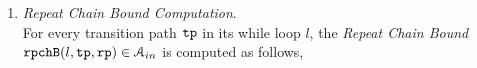 \begin{enumerate}
\begin{enumerate}
%
%
\item  \emph{Repeat Chain Bound Computation}.
\\
For every transition path $\mathtt{tp}$
in its  while loop $l$,
the \emph{Repeat Chain Bound} $\mathtt{rpchB}(l, \mathtt{tp}, \mathtt{rp}) \in \mathcal{A}_{in}$ is computed as follows,

\end{enumerate}
\end{enumerate}
